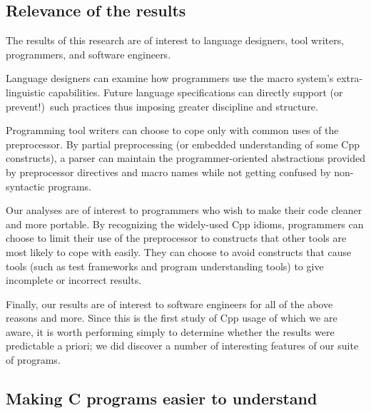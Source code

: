 \documentclass[10pt]{article}
\begin{document}


\subsection{Relevance of the results}

The results of this research are of interest to language designers, tool
writers, programmers, and software engineers.

Language designers can examine how programmers use the macro system's
extra-linguistic capabilities.  Future language specifications can
directly support (or prevent!)\ such practices thus imposing greater
discipline and structure.


Programming tool writers can choose to cope only with common uses of the
preprocessor.  By partial preprocessing (or embedded understanding of
some Cpp constructs), a parser can maintain the
programmer-oriented abstractions provided by preprocessor directives and
macro names while not getting confused by non-syntactic programs.

Our analyses are of interest to programmers who wish to make their code
cleaner and more portable.  By recognizing the widely-used Cpp idioms,
programmers can choose to limit their use of the preprocessor to
constructs that other tools are most likely to cope with easily.  They
can choose to avoid constructs that cause tools (such as test frameworks
and program understanding tools) to give incomplete or incorrect
results.


Finally, our results are of interest to software engineers for all of the
above reasons and more.  Since this is the first study of Cpp usage of
which we are aware, it is worth performing simply to determine whether the
results were predictable a priori; we did discover a number of interesting
features of our suite of programs.


\subsection{Making C programs easier to understand}
\end{document}
